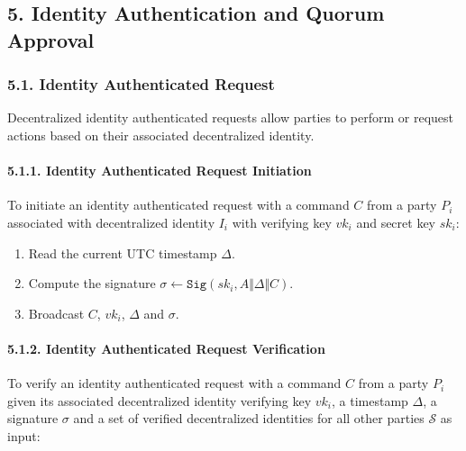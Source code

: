 \documentclass[
]{article}
\providecommand{\tightlist}{%
  \setlength{\itemsep}{0pt}\setlength{\parskip}{0pt}}
\begin{document}
\hypertarget{identity-auth-and-quorum-approval}{%
\subsection{5. Identity Authentication and Quorum
Approval}\label{identity-auth-and-quorum-approval}}

\hypertarget{identity-authed-request}{%
\subsubsection{5.1. Identity Authenticated
Request}\label{identity-authed-request}}

Decentralized identity authenticated requests allow parties to perform
or request actions based on their associated decentralized identity.

\hypertarget{identity-authed-request-initiation}{%
\paragraph{5.1.1. Identity Authenticated Request
Initiation}\label{identity-authed-request-initiation}}

To initiate an identity authenticated request with a command \(C\) from
a party \(P_i\) associated with decentralized identity \(I_i\) with
verifying key \(vk_i\) and secret key \(sk_i\):

\begin{enumerate}
\def\labelenumi{\arabic{enumi}.}
\tightlist
\item
  Read the current UTC timestamp \(\Delta\).
\item
  Compute the signature
  \(\sigma \leftarrow \mathtt{Sig}(sk_i, A \Vert \Delta \Vert C)\).
\item
  Broadcast \(C\), \(vk_i\), \(\Delta\) and \(\sigma\).
\end{enumerate}

\hypertarget{identity-authed-request-verification}{%
\paragraph{5.1.2. Identity Authenticated Request
Verification}\label{identity-authed-request-verification}}

To verify an identity authenticated request with a command \(C\) from a
party \(P_i\) given its associated decentralized identity verifying key
\(vk_i\), a timestamp \(\Delta\), a signature \(\sigma\) and a set of
verified decentralized identities for all other parties \(\mathcal{S}\)
as input:
\end{document}
